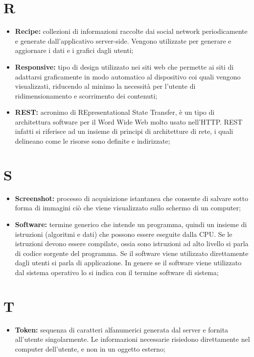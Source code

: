 	\section*{\Huge R} %
		\begin{itemize}
			\item \textbf{Recipe:} collezioni di informazioni raccolte dai social network periodicamente e generate dall'applicativo server-side. Vengono utilizzate per generare e aggiornare i dati e i grafici dagli utenti;
			\item \textbf{Responsive:} tipo di design utilizzato nei siti web che permette ai siti di adattarsi graficamente in modo automatico al dispositivo coi quali vengono visualizzati, riducendo al minimo la necessità per l'utente di ridimensionamento e scorrimento dei contenuti;
			\item \textbf{REST:} acronimo di REpresentational State Transfer, è un tipo di architettura software per il Word Wide Web molto usato nell'HTTP. REST infatti si riferisce ad un insieme di principi di architetture di rete, i quali delineano come le risorse sono definite e indirizzate;
			\end{itemize}

	\section*{\Huge S} %
		\begin{itemize}
			\item \textbf{Screenshot:} processo di acquisizione istantanea che consente di salvare sotto forma di immagini ciò che viene visualizzato sullo schermo di un computer;
			\item \textbf{Software:} termine generico che intende un programma, quindi un insieme di istruzioni (algoritmi e dati) che possono essere eseguite dalla CPU. Se le istruzioni devono essere compilate, ossia sono istruzioni ad alto livello si parla di codice sorgente del programma. Se il software viene utilizzato direttamente dagli utenti si parla di applicazione. In genere se il software viene utilizzato dal sistema operativo lo si indica con il termine software di sistema;
		\end{itemize}

	\section*{\Huge T} %
		\begin{itemize}
			\item \textbf{Token:} sequenza di caratteri alfanumerici generata dal server e fornita all'utente singolarmente. Le informazioni necessarie risiedono direttamente nel computer dell'utente, e non in un oggetto esterno;
		\end{itemize}

